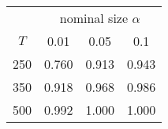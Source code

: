 % 

\renewcommand{\arraystretch}{1.2}
\begin{tabular}{cccc}
\hline
    & \multicolumn{3}{c}{nominal size $\alpha$} \\
$T$ & 0.01 & 0.05 & 0.1 \\ 
\hline
250 & 0.760 & 0.913 & 0.943 \\ 
350 & 0.918 & 0.968 & 0.986 \\ 
500 & 0.992 & 1.000 & 1.000 \\ 
\hline
\end{tabular}
